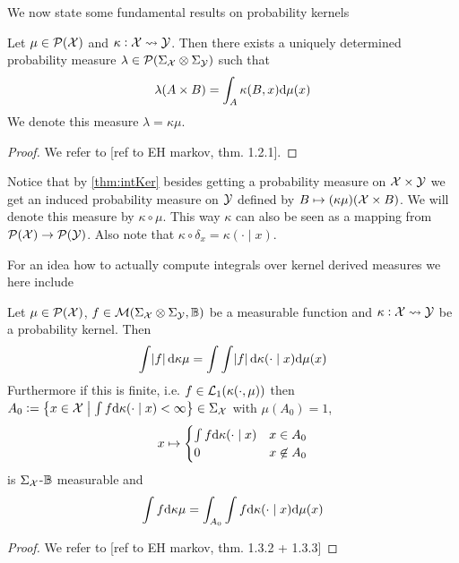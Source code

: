We now state some fundamental results on probability kernels
\begin{thm}
  Let $\mu \in \mathcal{P}(\mathcal{X})$ and $\kappa : \mathcal{X} \leadsto \mathcal{Y}$.
  Then there exists a uniquely determined probability measure
  $\lambda \in \mathcal{P}(\Sigma_\mathcal{X} \otimes \Sigma_\mathcal{Y})$
  such that
  \[ \lambda(A \times B) = \int_A \kappa(B, x) \mathrm{d} \mu(x) \]
  \label{thm:intKer}
  We denote this measure $\lambda = \kappa \mu$.
\end{thm}
\begin{proof}
  We refer to [ref to EH markov, thm. 1.2.1].
\end{proof}

Notice that by \cref{thm:intKer}
besides getting a probability measure on $\mathcal{X} \times \mathcal{Y}$
we get an induced probability measure
on $\mathcal{Y}$ defined by $B \mapsto (\kappa \mu)(\mathcal{X} \times B)$.
We will denote this measure by $\kappa \circ \mu$.
This way $\kappa$ can also be seen as a mapping from
$\mathcal{P}(\mathcal{X}) \to \mathcal{P}(\mathcal{Y})$.
Also note that $\kappa \circ \delta_x = \kappa(\cdot \mid x)$.

For an idea how to actually compute integrals over kernel derived measures
we here include
\begin{thm}
  Let $\mu \in \mathcal{P}(\mathcal{X})$,
  $f \in \mathcal{M}(\Sigma_\mathcal{X} \otimes \Sigma_\mathcal{Y}, \mathbb{B})$
  be a measurable function and
  $\kappa : \mathcal{X} \leadsto \mathcal{Y}$ be a probability kernel.
  Then
  \[ \int \abs{f} \mathrm{d} \kappa \mu
  = \int \int \abs{f} \mathrm{d} \kappa(\cdot \mid x) \mathrm{d} \mu(x) \]
  Furthermore if this is finite, i.e. $f \in \mathcal{L}_1(\kappa(\cdot, \mu))$
  then $A_0 \vcentcolon= \left\{ x \in \mathcal{X} \;\middle\vert\;
    \int f \mathrm{d} \kappa(\cdot \mid x) < \infty \right\}
  \in \Sigma_\mathcal{X}$
  with $\mu(A_0) = 1$, 
  \[ x \mapsto \begin{cases}
      \int f \mathrm{d} \kappa(\cdot \mid x) & x \in A_0
      \\ 0 & x \not\in A_0
  \end{cases} \]
  is $\Sigma_\mathcal{X}$-$\mathbb{B}$ measurable and
  \[ \int f \mathrm{d} \kappa \mu
  = \int_{A_0} \int f \mathrm{d} \kappa(\cdot \mid x) \mathrm{d} \mu(x) \]  
  \label{thm:extTonFub}
\end{thm}
\begin{proof}
  We refer to [ref to EH markov, thm. 1.3.2 + 1.3.3]
\end{proof}

